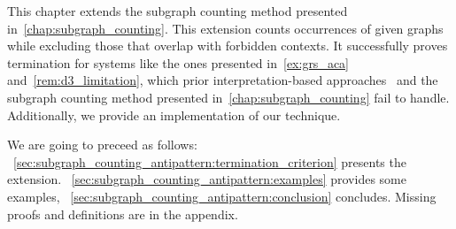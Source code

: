 This chapter extends the subgraph counting method presented in~\autoref{chap:subgraph_counting}. This extension counts occurrences of given graphs while excluding those that overlap with forbidden contexts.
It successfully proves termination for systems like the ones presented 
in~\autoref{ex:grs_aca} and~\autoref{rem:d3_limitation}, which prior interpretation-based approaches~\cite{zantema2014termination,bruggink2014termination,bruggink2015proving,endrullis2024generalized_arxiv_v2,overbeek2024termination_lmcs} and the subgraph counting method presented in~\autoref{chap:subgraph_counting} fail to handle. 
Additionally, we provide an implementation of our technique.

We are going to preceed as follows:
~\autoref{sec:subgraph_counting_antipattern:termination_criterion} presents the extension.
~\autoref{sec:subgraph_counting_antipattern:examples} provides some examples,
~\autoref{sec:subgraph_counting_antipattern:conclusion} concludes. Missing proofs and definitions are in the appendix. 